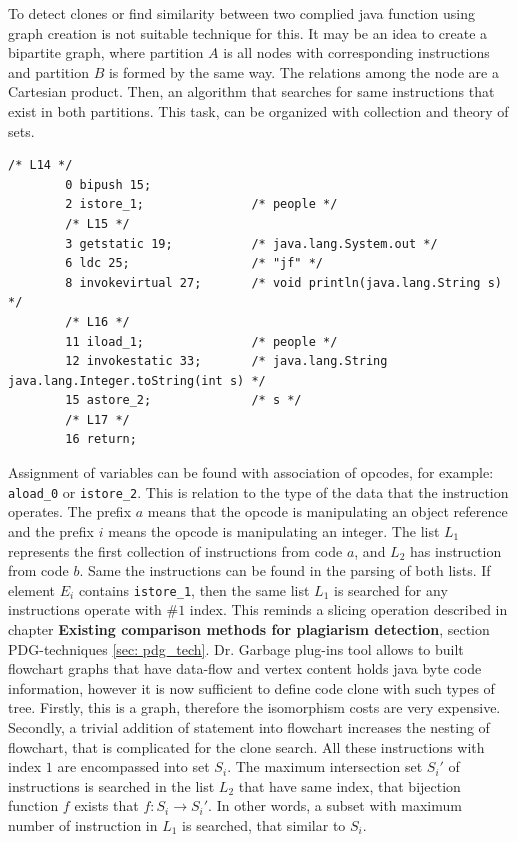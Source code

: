 \documentclass{report}
\begin{document}
To detect clones or find similarity between two complied java function using graph creation is not suitable technique for this. It may be an idea to create a bipartite graph, where partition $A$ is all nodes with corresponding instructions and partition $B$ is formed by the same way. The relations among the node are a Cartesian product. Then, an algorithm that searches for same instructions that exist in both partitions. This task, can be organized with collection and theory of sets.
\begin{lstlisting}[caption= Example of extracted java byte code.]
        /* L14 */
        0 bipush 15;
        2 istore_1;               /* people */
        /* L15 */
        3 getstatic 19;           /* java.lang.System.out */
        6 ldc 25;                 /* "jf" */
        8 invokevirtual 27;       /* void println(java.lang.String s) */
        /* L16 */
        11 iload_1;               /* people */
        12 invokestatic 33;       /* java.lang.String java.lang.Integer.toString(int s) */
        15 astore_2;              /* s */
        /* L17 */
        16 return;
\end{lstlisting}

Assignment of variables can be found with association of opcodes, for example: \texttt{aload\_0} or \texttt{istore\_2}. 
This is relation to the type of the data that the instruction operates. The prefix $a$ means that the opcode is manipulating an object reference and the prefix $i$ means the opcode is manipulating an integer. 
The list $ L_{1}$ represents the first collection of instructions from code $a$, and $L_{2}$ has instruction from code $b$. 
Same the instructions can be found in the parsing of both lists.
If element $E_{i}$ contains \texttt{istore\_1}, then the same list $L_{1}$ is searched for any instructions operate with $\#1$ index. This reminds a slicing operation described in chapter \textbf{Existing comparison methods for plagiarism detection}, section PDG-techniques \ref{sec: pdg_tech}. Dr. Garbage plug-ins tool allows to built flowchart graphs that have data-flow and vertex content holds java byte code information, however it is now sufficient to define code clone with such types of tree. Firstly, this is a graph, therefore the isomorphism costs are very expensive. Secondly, a trivial addition of statement into flowchart increases the nesting of flowchart, that is complicated for the clone search.
All these instructions with index $1$ are encompassed into set $S_{i}$. The maximum intersection set $S_{i}'$ of instructions is searched in the list $L_{2}$ that have same index, that bijection function $f$ exists that $f: S_{i} \rightarrow S_{i}'$. In other words, a subset with maximum number of instruction in $L_{1}$ is searched, that similar to $S_{i}$.
\end{document}
